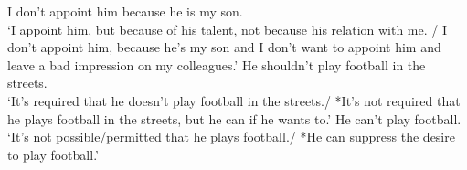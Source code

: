 \documentclass[UTF8, a4paper, oneside, scheme=plain]{ctexrep}
\newcommand{\translate}[1]{`#1'}
\begin{document}
\begin{exe} 
    \ex\label{ex:verb-inflection.negation-ambiguity-1} 
    I don't appoint him because he is my son. \\
    \translate{I appoint him, but because of his talent, not because his relation with me. / 
    I don't appoint him, because he's my son and I don't want to appoint him and  
    leave a bad impression on my colleagues.}
    \ex\label{ex:verb-inflection.negation-ambiguity-2}
    He shouldn't play football in the streets. \\
    \translate{It's required that he doesn't play football in the streets./
    *It's not required that he plays football in the streets,
    but he can if he wants to.} 
    \ex\label{ex:verb-inflection.negation-ambiguity-3}
    He can't play football. \\
    \translate{It's not possible/permitted that he plays football./
    *He can suppress the desire to play football.}
\end{exe}   
\end{document}
